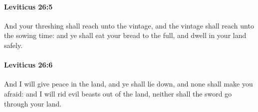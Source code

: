 		\paragraph{Leviticus 26:5} %
			\label{LEVITICUS-26-5}

			And your threshing shall reach unto the vintage, and the vintage shall reach unto the sowing time: and ye shall eat your bread to the full, and dwell in your land safely.


		\paragraph{Leviticus 26:6} %
			\label{LEVITICUS-26-6}

			And I will give peace in the land, and ye shall lie down, and none shall make you afraid: and I will rid evil beasts out of the land, neither shall the sword go through your land.


